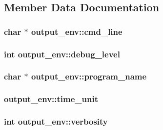 \subsection{\-Member \-Data \-Documentation}
\hypertarget{structoutput__env_a436631c570a1a5ccf8ccd4f600af452e}{
\subsubsection[{cmd\-\_\-line}]{\setlength{\rightskip}{0pt plus 5cm}char $\ast$ {\bf output\-\_\-env\-::cmd\-\_\-line}}}\label{structoutput__env_a436631c570a1a5ccf8ccd4f600af452e}
\hypertarget{structoutput__env_a6a0a49765e2892452a05ca2098c193f0}{
\subsubsection[{debug\-\_\-level}]{\setlength{\rightskip}{0pt plus 5cm}int {\bf output\-\_\-env\-::debug\-\_\-level}}}\label{structoutput__env_a6a0a49765e2892452a05ca2098c193f0}
\hypertarget{structoutput__env_a6e7acbd718949102d123546c5567890e}{
\subsubsection[{program\-\_\-name}]{\setlength{\rightskip}{0pt plus 5cm}char $\ast$ {\bf output\-\_\-env\-::program\-\_\-name}}}\label{structoutput__env_a6e7acbd718949102d123546c5567890e}
\hypertarget{structoutput__env_a6c461212851b05404c4d5d441ff1f715}{
\subsubsection[{time\-\_\-unit}]{ {\bf output\-\_\-env\-::time\-\_\-unit}}}\label{structoutput__env_a6c461212851b05404c4d5d441ff1f715}
\hypertarget{structoutput__env_a08cfed7a1244aaacf0b2434943d3f27d}{
\subsubsection[{verbosity}]{\setlength{\rightskip}{0pt plus 5cm}int {\bf output\-\_\-env\-::verbosity}}}\label{structoutput__env_a08cfed7a1244aaacf0b2434943d3f27d}
